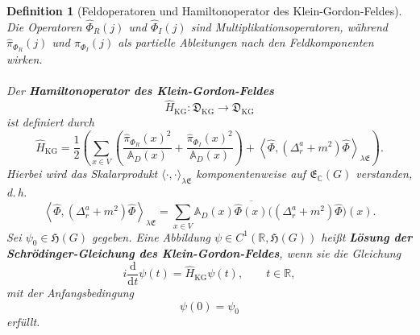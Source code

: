\documentclass[11pt,a4paper,leqno]{report}
\newtheorem{definition}[theorem]{Definition}
\numberwithin{equation}{chapter}
\begin{document}
\begin{definition}[Feldoperatoren und Hamiltonoperator des Klein-Gordon-Feldes]
	Die Operatoren $\hat\Phi_R(j)$ und $\hat\Phi_I(j)$ sind
	Multiplikationsoperatoren, während $\hat\pi_{\Phi_R}(j)$ und
	$\hat\pi_{\Phi_I}(j)$ als partielle Ableitungen nach den
	Feldkomponenten wirken.\\
	\\
	Der \textbf{Hamiltonoperator des Klein-Gordon-Feldes}
	\[
	\hat H_{\mathrm{KG}}:\mathfrak D_{\mathrm{KG}}\to\mathfrak D_{\mathrm{KG}}
	\]
	ist definiert durch
	\begin{equation}
		\hat H_{\mathrm{KG}}
		=
		\frac12
		\left(
		\sum_{x\in V}
		\left(
		\frac{\hat\pi_{\Phi_R}(x)^2}{\mathbb A_D(x)}
		+
		\frac{\hat\pi_{\Phi_I}(x)^2}{\mathbb A_D(x)}
		\right)
		+
		\left\langle
		\hat\Phi,
		(\Delta_r^a+m^2)\hat\Phi
		\right\rangle_{\lambda\mathfrak E}
		\right).
		\label{eq:KG-Hamilton}
	\end{equation}
	Hierbei wird das Skalarprodukt
	$\langle\cdot,\cdot\rangle_{\lambda\mathfrak E}$
	komponentenweise auf $\mathfrak E_{\mathbb C}(G)$ verstanden, d.\,h.
	\[
	\left\langle
	\hat\Phi,
	(\Delta_r^a+m^2)\hat\Phi
	\right\rangle_{\lambda\mathfrak E}
	=
	\sum_{x\in V}\mathbb{A}_D(x)
	\overline{\hat\Phi(x)}
	\bigl((\Delta_r^a+m^2)\hat\Phi\bigr)(x).
	\]
	Sei $\psi_0\in\mathfrak H(G)$ gegeben. Eine Abbildung
	$\psi\in C^1(\mathbb R,\mathfrak H(G))$ heißt
	\textbf{Lösung der Schrödinger-Gleichung des Klein-Gordon-Feldes},
	wenn sie die Gleichung
	\begin{equation}
		i\frac{\mathrm d}{\mathrm dt}\psi(t)
		=
		\hat H_{\mathrm{KG}}\psi(t),
		\qquad t\in\mathbb R,
		\label{eq:KG-Schroedinger}
	\end{equation}
	mit der Anfangsbedingung
	\begin{equation}
		\psi(0)=\psi_0
		\label{eq:KG-Schroedinger-IC}
	\end{equation}
	erfüllt.
\end{definition}
\end{document}
